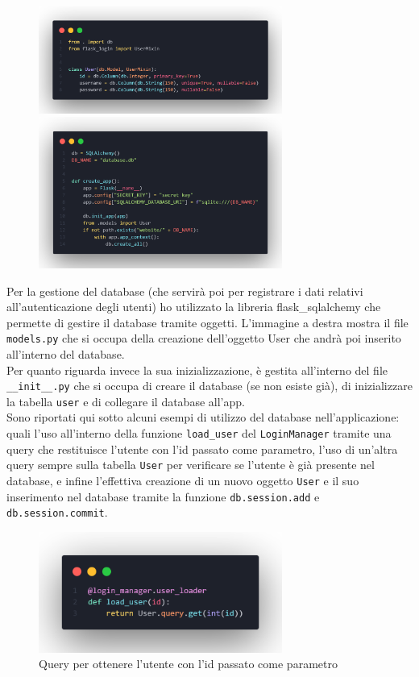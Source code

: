 \documentclass[12pt]{article}
\def\code#1{\texttt{#1}}
\begin{document}
\begin{figure}
    \begin{minipage}{\linewidth}
        \includegraphics[width=8cm]{models.png}
        \includegraphics[width=8cm]{init-db.png}
    \end{minipage}
\end{figure}
\justifying
Per la gestione del database (che servirà poi per registrare i dati relativi all'autenticazione degli utenti) ho utilizzato la libreria flask\_sqlalchemy che permette di gestire il database tramite oggetti. L'immagine a destra mostra il file \code{models.py} che si occupa della creazione dell'oggetto User che andrà poi inserito all'interno del database. \\
Per quanto riguarda invece la sua inizializzazione, è gestita all'interno del file \code{\_\_init\_\_.py} che si occupa di creare il database (se non esiste già), di inizializzare la tabella \code{user} e di collegare il database all'app. \\
Sono riportati qui sotto alcuni esempi di utilizzo del database nell'applicazione: quali l'uso all'interno della funzione \code{load\_user} del \code{LoginManager} tramite una query che restituisce l'utente con l'id passato come parametro, l'uso di un'altra query sempre sulla tabella \code{User} per verificare se l'utente è già presente nel database, e infine l'effettiva creazione di un nuovo oggetto \code{User} e il suo inserimento nel database tramite la funzione \code{db.session.add} e \code{db.session.commit}.
\begin{figure}[h]
    \centering
    \includegraphics[width=8cm]{query-user.png}
    \caption{Query per ottenere l'utente con l'id passato come parametro}
\end{figure}
\end{document}
